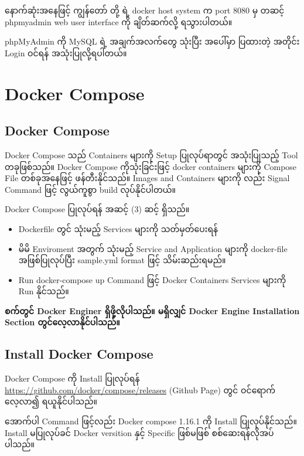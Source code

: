 \documentclass[]{article}
\providecommand{\tightlist}{%
  \setlength{\itemsep}{0pt}\setlength{\parskip}{0pt}}
\begin{document}
နောက်ဆုံးအနေဖြင့် ကျွန်တော် တို့ ရဲ့ docker host system က port 8080 မှ
တဆင့် phpmyadmin web user interface ကို ချိတ်ဆက်လို့ ရသွားပါတယ်။

phpMyAdmin ကို MySQL ရဲ့ အချက်အလက်တွေ သုံးပြီး အပေါ်မှာ ပြထားတဲ့ အတိုင်း
Login ဝင်ရန် အသုံးပြုလို့ရပါတယ်။

\pagebreak

\hypertarget{docker-compose}{%
\section{Docker Compose}\label{docker-compose}}

\hypertarget{docker-compose-1}{%
\subsection{Docker Compose}\label{docker-compose-1}}

Docker Compose သည် Containers များကို Setup ပြုလုပ်ရာတွင် အသုံးပြုသည့်
Tool တခုဖြစ်သည်။ Docker Compose ကိုသုံးခြင်းဖြင့် docker containers
များကို Compose File တစ်ခုအနေဖြင့် ဖန်တီးနိုင်သည်။ Images and Containers
များကို လည်း Signal Command ဖြင့် လွယ်ကူစွာ build လုပ်နိုင်ပါတယ်။

Docker Compose ပြုလုပ်ရန် အဆင့် (3) ဆင့် ရှိသည်။

\begin{itemize}
\tightlist
\item
  Dockerfile တွင် သုံးမည့် Services များကို သတ်မှတ်ပေးရန်
\item
  မိမိ Enviroment အတွက် သုံးမည့် Service and Application များကို
  docker-file အဖြစ်ပြုလုပ်ပြီး sample.yml format ဖြင့် သိမ်းဆည်းရမည်။
\item
  Run docker-compose up Command ဖြင့် Docker Containers Services များကို
  Run နိုင်သည်။
\end{itemize}

\textbf{စက်တွင် Docker Enginer ရှိဖို့လိုပါသည်။ မရှိလျှင် Docker Engine
Installation Section တွင်လေ့လာနိုင်ပါသည်။}

\hypertarget{install-docker-compose}{%
\subsection{Install Docker Compose}\label{install-docker-compose}}

Docker Compose ကို Install ပြုလုပ်ရန်
\url{https://github.com/docker/compose/releases} (Github Page) တွင်
ဝင်ရောက်လေ့လာ၍ ရယူနိုင်ပါသည်။

အောက်ပါ Command ဖြင့်လည်း Docker compose 1.16.1 ကို Install
ပြုလုပ်နိုင်သည်။ Install မပြုလုပ်ခင် Docker versition နှင့် Specific
ဖြစ်မဖြစ် စစ်ဆေးရန်လိုအပ်ပါသည်။
\end{document}
